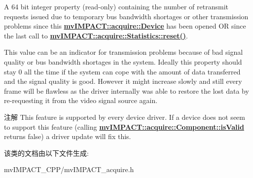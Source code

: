 A 64 bit integer property {\bfseries }(read-\/only) containing the number of retransmit requests issued due to temporary bus bandwidth shortages or other transmission problems since this {\bfseries \hyperlink{classmv_i_m_p_a_c_t_1_1acquire_1_1_device}{mv\+I\+M\+P\+A\+C\+T\+::acquire\+::\+Device}} has been opened O\+R since the last call to {\bfseries \hyperlink{classmv_i_m_p_a_c_t_1_1acquire_1_1_statistics_adc21a9add6973f8f829f751e616b0a43}{mv\+I\+M\+P\+A\+C\+T\+::acquire\+::\+Statistics\+::reset()}}. 

This value can be an indicator for transmission problems because of bad signal quality or bus bandwidth shortages in the system. Ideally this property should stay 0 all the time if the system can cope with the amount of data transferred and the signal quality is good. However it might increase slowly and still every frame will be flawless as the driver internally was able to restore the lost data by re-\/requesting it from the video signal source again.

\begin{DoxyNote}{注解}
This feature is supported by every device driver. If a device does not seem to support this feature (calling {\bfseries \hyperlink{classmv_i_m_p_a_c_t_1_1acquire_1_1_component_ac51e55e7e046101f3c6119d84123abd5}{mv\+I\+M\+P\+A\+C\+T\+::acquire\+::\+Component\+::is\+Valid}} returns false) a driver update will fix this. 
\end{DoxyNote}


该类的文档由以下文件生成\+:\begin{DoxyCompactItemize}
\item 
mv\+I\+M\+P\+A\+C\+T\+\_\+\+C\+P\+P/mv\+I\+M\+P\+A\+C\+T\+\_\+acquire.\+h\end{DoxyCompactItemize}
